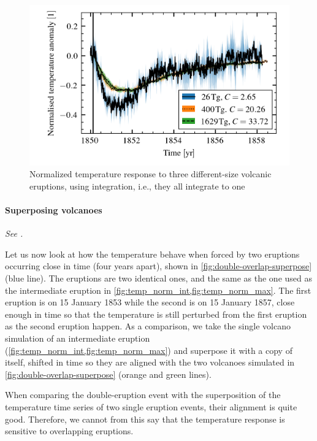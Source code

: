 \documentclass[twocol]{ametsocV5}
\begin{document}
\begin{figure}
  \begin{center}
    \includegraphics[width=0.95\linewidth]{figures/compare-waveform-integrate.png}
  \end{center}
  \caption{Normalized temperature response to three different-size volcanic eruptions,
    using integration, i.e., they all integrate to one}%
  \label{fig:temp_norm_int}
\end{figure}

\paragraph{Superposing volcanoes}

\emph{See \citet{toohey2016b}.}


Let us now look at how the temperature behave when forced by two eruptions occurring
close in time (four years apart), shown in \cref{fig:double-overlap-superpose} (blue
line). The eruptions are two identical ones, and the same as the one used as the
intermediate eruption in \cref{fig:temp_norm_int,fig:temp_norm_max}. The first eruption
is on 15 January 1853 while the second is on 15 January 1857, close enough in time so
that the temperature is still perturbed from the first eruption as the second eruption
happen. As a comparison, we take the single volcano simulation of an intermediate
eruption (\cref{fig:temp_norm_int,fig:temp_norm_max}) and superpose it with a copy of
itself, shifted in time so they are aligned with the two volcanoes simulated in
\cref{fig:double-overlap-superpose} (orange and green lines).

When comparing the double-eruption event with the superposition of the temperature time
series of two single eruption events, their alignment is quite good. Therefore, we
cannot from this say that the temperature response is sensitive to overlapping
eruptions.
\end{document}
